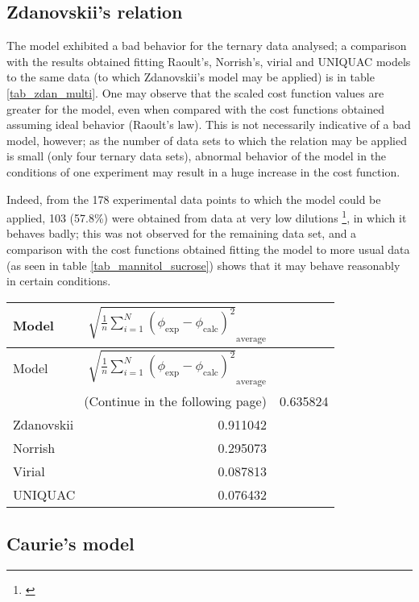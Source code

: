 \documentclass[
	12pt,				%
	openright,
	twoside,
	a4paper,			%
	brazil,			%
	french,				%
	english				%
	]{abntex2}
\begin{document}
\subsection{Zdanovskii's relation}

The model exhibited a bad behavior for the ternary data analysed; a comparison
with the results obtained fitting Raoult's, Norrish's, virial and UNIQUAC models
to the same data (to which Zdanovskii's model may be applied) is in table
\ref{tab_zdan_multi}. One may observe that the scaled cost function values are
greater for the model, even when compared with the cost functions obtained assuming
ideal behavior (Raoult's law). This is not necessarily indicative of a bad model,
however; as the number of data sets to which the relation may be applied is small
(only four ternary data sets), abnormal behavior of the model in the conditions
of one experiment may result in a huge increase in the cost function.

Indeed, from the 178 experimental data points to which the model could be applied,
103 (57.8\%) were obtained from data at very low dilutions
\footnote{\cite{abderafi1994}}, in which it behaves badly; this was not observed
for the remaining data set, and a comparison with the cost functions obtained fitting
the model to more usual data (as seen in table \ref{tab_mannitol_sucrose}) shows
that it may behave reasonably in certain conditions.

\begin{tabularx}{\textwidth}{ X  r }
	\caption{Comparison Zdanovskii's model}
	\label{tab_zdan_multi}\\
	\toprule
	Model & %
		$\sqrt{\frac{1}{n}\sum_{i=1}^N(\phi_{\text{exp}}-%
		\phi_{\text{calc}})^2}_\text{average}$\\
	\midrule
	\endfirsthead
	\toprule
	Model & %
		$\sqrt{\frac{1}{n}\sum_{i=1}^N(\phi_{\text{exp}}-%
		\phi_{\text{calc}})^2}_\text{average}$\\\hline
	\midrule
	\endhead
	\midrule
	\multicolumn{2}{r}{\footnotesize(Continue in the following page)}
	\endfoot
	\endlastfoot
	Raoult & 0.635824 \\
	Zdanovskii & 0.911042 \\
	Norrish & 0.295073 \\
	Virial & 0.087813 \\
	UNIQUAC & 0.076432 \\\hline
\end{tabularx}

\subsection{Caurie's model}
\end{document}

